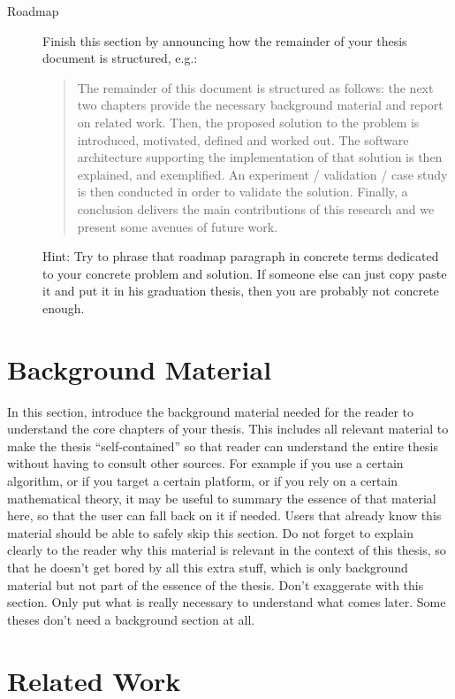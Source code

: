 \documentclass[twocolumn,british]{article}
\begin{document}
\begin{description}
\item[Roadmap] Finish this section by announcing how the remainder of
  your thesis document is structured, e.g.:
  \begin{quote}
    The remainder of this document is structured as follows: the next
    two chapters provide the necessary background material and report
    on related work. Then, the proposed solution to the problem is
    introduced, motivated, defined and worked out. The software
    architecture supporting the implementation of that solution is
    then explained, and exemplified. An experiment / validation / case
    study is then conducted in order to validate the
    solution. Finally, a conclusion delivers the main contributions of
    this research and we present some avenues of future work.
  \end{quote}
  Hint: Try to phrase that roadmap paragraph in concrete terms
  dedicated to your concrete problem and solution. If someone else can
  just copy paste it and put it in his graduation thesis, then you are
  probably not concrete enough.
\end{description}

\section*{Background Material}

In this section, introduce the background material needed for the
reader to understand the core chapters of your thesis. This includes
all relevant material to make the thesis “self-contained” so that
reader can understand the entire thesis without having to consult
other sources. For example if you use a certain algorithm, or if you
target a certain platform, or if you rely on a certain mathematical
theory, it may be useful to summary the essence of that material here,
so that the user can fall back on it if needed. Users that already
know this material should be able to safely skip this section. Do not
forget to explain clearly to the reader why this material is relevant
in the context of this thesis, so that he doesn’t get bored by all
this extra stuff, which is only background material but not part of
the essence of the thesis. Don’t exaggerate with this section. Only
put what is really necessary to understand what comes later. Some
theses don’t need a background section at all.

\section*{Related Work}
\end{document}
